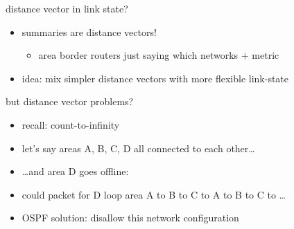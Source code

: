 \begin{frame}{distance vector in link state?}
    \begin{itemize}
    \item summaries are distance vectors!
        \begin{itemize}
        \item area border routers just saying which networks + metric
        \end{itemize}
    \item idea: mix simpler distance vectors with more flexible link-state
    \end{itemize}
\end{frame}

\begin{frame}{but distance vector problems?}
    \begin{itemize}
    \item recall: count-to-infinity
    \item let's say areas A, B, C, D all connected to each other\ldots
    \item \ldots and area D goes offline:
    \item could packet for D loop area A to B to C to A to B to C to \ldots
    \vspace{.5cm}
    \item<2-> OSPF solution: disallow this network configuration
    \end{itemize}
\end{frame}
